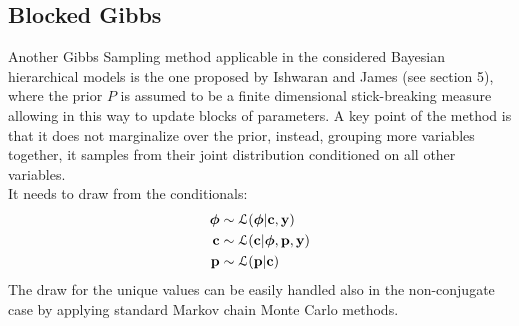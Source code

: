 \subsection{Blocked Gibbs}
Another Gibbs Sampling method applicable in the considered Bayesian hierarchical models is the one proposed by Ishwaran and James (see \cite{james} section 5), where the prior $P$ is assumed to be a finite dimensional stick-breaking measure allowing in this way to update blocks of parameters.
A key point of the method is that it does not marginalize over the prior, instead, grouping more variables together, it samples from their joint distribution conditioned on all other variables. \\
It needs to draw from the conditionals:
\begin{align}
	\boldsymbol\phi &\sim \mathcal L(\boldsymbol\phi | \mathbf{c}, \mathbf{y}) \nonumber \\
	\mathbf{c} &\sim \mathcal L (\mathbf{c}| \boldsymbol\phi,\mathbf{p}, \mathbf{y}) \nonumber \\
	\mathbf{p} &\sim \mathcal L (\mathbf{p}| \mathbf{c}) \nonumber
\end{align}
The draw for the unique values can be easily handled also in the non-conjugate case by applying standard Markov chain Monte Carlo methods.
